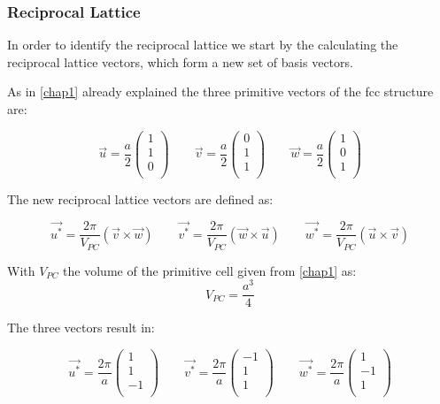 \subsubsection*{Reciprocal Lattice}
In order to identify the reciprocal lattice we start by the calculating
the reciprocal lattice vectors, which form a new set of basis vectors.

As in \autoref{chap1} already explained the three primitive vectors
of the fcc structure are:

$$\vec{u} = \frac{a}{2} \left(\begin{matrix}1\\1\\0\\\end{matrix}\right) \qquad
\vec{v} = \frac{a}{2} \left(\begin{matrix}0\\1\\1\\\end{matrix}\right) \qquad
\vec{w} = \frac{a}{2} \left(\begin{matrix}1\\0\\1\\\end{matrix}\right)$$

The new reciprocal lattice vectors are defined as:

\begin{equation}
    \vec{u^*} = \frac{2 \pi}{V_{PC}} (\vec{v} \times \vec{w}) \qquad
    \vec{v^*} = \frac{2 \pi}{V_{PC}} (\vec{w} \times \vec{u}) \qquad
    \vec{w^*} = \frac{2 \pi}{V_{PC}} (\vec{u} \times \vec{v})
\end{equation}

With $V_{PC}$ the volume of the primitive cell given from \autoref{chap1}
as:
$$V_{PC} = \frac{a^3}{4}$$

The three vectors result in:

$$
    \vec{u^*} = \frac{2\pi}{a} \left(\begin{matrix}1\\1\\-1\\\end{matrix}\right) \qquad
    \vec{v^*} = \frac{2\pi}{a} \left(\begin{matrix}-1\\1\\1\\\end{matrix}\right) \qquad
    \vec{w^*} = \frac{2\pi}{a} \left(\begin{matrix}1\\-1\\1\\\end{matrix}\right)
$$

